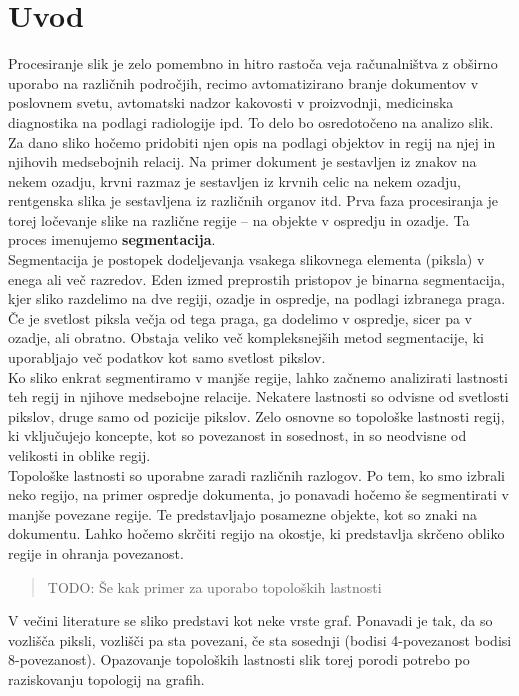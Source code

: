 \documentclass[a4paper, 12pt]{book}
\theoremstyle{definition}
\begin{document}
\chapter{Uvod}
Procesiranje slik je zelo pomembno in hitro rastoča veja računalništva z 
obširno uporabo na različnih področjih, recimo avtomatizirano branje dokumentov
v poslovnem svetu, avtomatski nadzor kakovosti v proizvodnji, medicinska diagnostika
na podlagi radiologije ipd. To delo bo osredotočeno na analizo slik.
Za dano sliko hočemo pridobiti njen opis na podlagi objektov in regij na njej
in njihovih medsebojnih relacij. Na primer dokument je sestavljen iz znakov na nekem ozadju, krvni razmaz je 
sestavljen iz krvnih celic na nekem ozadju, rentgenska slika je sestavljena
iz različnih organov itd. Prva faza procesiranja je torej ločevanje slike na
različne regije -- na objekte v ospredju in ozadje. Ta proces imenujemo \textbf{segmentacija}.\\
Segmentacija je postopek dodeljevanja vsakega slikovnega elementa (piksla) v enega ali več
razredov. Eden izmed preprostih pristopov je binarna segmentacija, kjer sliko razdelimo
na dve regiji, ozadje in ospredje, na podlagi izbranega praga. Če je svetlost piksla večja
od tega praga, ga dodelimo v ospredje, sicer pa v ozadje, ali obratno. Obstaja veliko več
kompleksnejših metod segmentacije, ki uporabljajo več podatkov kot samo svetlost
pikslov.\\
Ko sliko enkrat segmentiramo v manjše regije, lahko začnemo analizirati lastnosti
teh regij in njihove medsebojne relacije. Nekatere lastnosti so odvisne od svetlosti
pikslov, druge samo od pozicije pikslov. Zelo osnovne so topološke lastnosti
regij, ki vključujejo koncepte, kot so povezanost in sosednost, in so neodvisne od
velikosti in oblike regij.\\
Topološke lastnosti so uporabne zaradi različnih razlogov. Po tem, ko smo izbrali
neko regijo, na primer ospredje dokumenta, jo ponavadi hočemo še segmentirati v
manjše povezane regije. Te predstavljajo posamezne objekte, kot so znaki na dokumentu. Lahko
hočemo skrčiti regijo na okostje, ki predstavlja skrčeno obliko regije in ohranja
povezanost.
\begin{quote}
    TODO: Še kak primer za uporabo topoloških lastnosti
\end{quote}
V večini literature se sliko predstavi kot neke vrste graf. Ponavadi je tak, da
so vozlišča piksli, vozlišči pa sta povezani, če sta sosednji (bodisi 4-povezanost
bodisi 8-povezanost). Opazovanje topoloških lastnosti slik torej porodi potrebo po
raziskovanju topologij na grafih.
\end{document}
